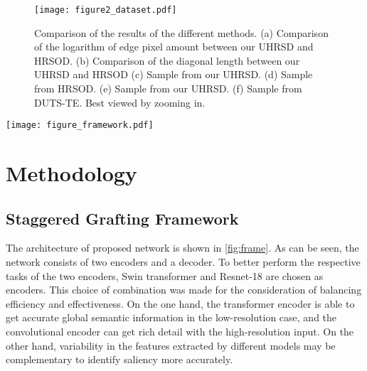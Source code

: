 \documentclass[10pt,twocolumn,letterpaper]{article}
\begin{document}
\begin{figure}[t]

\centering
\texttt{[image: figure2\_dataset.pdf]}
\caption{Comparison of the results of the different methods. (a) Comparison of the logarithm of edge pixel amount between our UHRSD and HRSOD. (b) Comparison of the diagonal length between our UHRSD and HRSOD\cite{zeng2019towards} (c) Sample from our UHRSD. (d) Sample from HRSOD. (e) Sample from our UHRSD. (f) Sample from DUTS-TE. Best viewed by zooming in. }

\label{fig:dataset}
\end{figure}


\label{sec:dataset}




\begin{figure*}[h]
  \centering
  \texttt{[image: figure\_framework.pdf]}
  \caption{An overview of proposed Pyramid Grafting Network. Dual branches use Resnet and Swin transformer as encoder respectively. The DB is the Decoder block with  input features, and the specific structure are shown on the right side. The two auxiliary supervisions are used to supervise the  and  mentioned in \cref{subsec:agl}.}
  \label{fig:frame}
\end{figure*}
\section{Methodology}

\subsection{Staggered Grafting Framework}
The architecture of proposed network is shown in \cref{fig:frame}. As can be seen, the network consists of two encoders and a decoder. To better perform the respective tasks of the two encoders, Swin transformer and Resnet-18 are chosen as encoders. This choice of combination was made for the consideration of balancing efficiency and effectiveness. On the one hand, the transformer encoder is able to get accurate global semantic information in the low-resolution case, and the convolutional encoder can get rich detail with the high-resolution input. On the other hand, variability in the features extracted by different models may be complementary to identify saliency more accurately.
\end{document}
